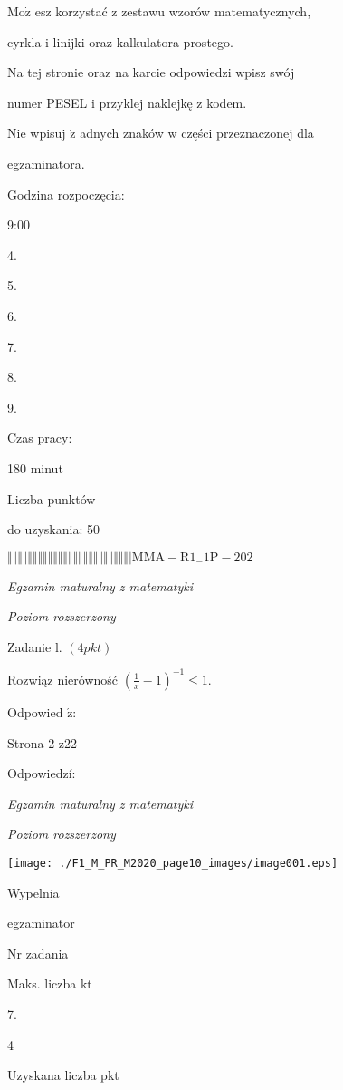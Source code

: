 \documentclass[a4paper,12pt]{article}
\begin{document}
$\mathrm{M}\mathrm{o}\dot{\mathrm{z}}$ esz korzystać z zestawu wzorów matematycznych,

cyrkla i linijki oraz kalkulatora prostego.

Na tej stronie oraz na karcie odpowiedzi wpisz swój

numer PESEL i przyklej naklejkę z kodem.

Nie wpisuj $\dot{\mathrm{z}}$ adnych znaków w części przeznaczonej dla

egzaminatora.

Godzina rozpoczęcia:

9:00

4.

5.

6.

7.

8.

9.

Czas pracy:

180 minut

Liczba punktów

do uzyskania: 50

$\Vert\Vert\Vert\Vert\Vert\Vert\Vert\Vert\Vert\Vert\Vert\Vert\Vert\Vert\Vert\Vert\Vert\Vert\Vert\Vert\Vert\Vert\Vert\Vert|  \mathrm{M}\mathrm{M}\mathrm{A}-\mathrm{R}1_{-}1\mathrm{P}-202$




{\it Egzamin maturalny z matematyki}

{\it Poziom rozszerzony}

Zadanie l. $(4pkt)$

Rozwiąz nierówność $(\displaystyle \frac{1}{x}-1)^{-1}\leq 1.$

Odpowied $\acute{\mathrm{z}}$:

Strona 2 z22





Odpowiedzí:

{\it Egzamin maturalny z matematyki}

{\it Poziom rozszerzony}
\begin{center}
\texttt{[image: ./F1\_M\_PR\_M2020\_page10\_images/image001.eps]}
\end{center}
Wypelnia

egzaminator

Nr zadania

Maks. liczba kt

7.

4

Uzyskana liczba pkt
\end{document}
